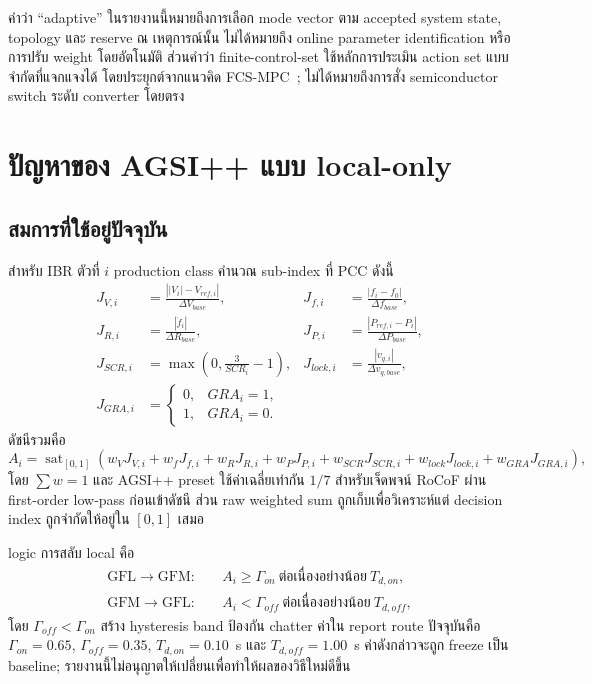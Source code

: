 \documentclass[12pt,a4paper]{article}
\newcommand{\sat}{\operatorname{sat}_{[0,1]}}
\begin{document}
คำว่า ``adaptive'' ในรายงานนี้หมายถึงการเลือก mode vector ตาม accepted system state,
topology และ reserve ณ เหตุการณ์นั้น ไม่ได้หมายถึง online parameter identification หรือการปรับ weight
โดยอัตโนมัติ ส่วนคำว่า finite-control-set ใช้หลักการประเมิน action set แบบจำกัดที่แจกแจงได้
โดยประยุกต์จากแนวคิด FCS-MPC~\cite{rodriguez2013}; ไม่ได้หมายถึงการสั่ง semiconductor switch
ระดับ converter โดยตรง

\section{ปัญหาของ AGSI++ แบบ local-only}

\subsection{สมการที่ใช้อยู่ปัจจุบัน}

สำหรับ IBR ตัวที่ $i$ production class คำนวณ sub-index ที่ PCC ดังนี้
\begin{align}
J_{V,i} &= \frac{\left||V_i|-V_{ref,i}\right|}{\Delta V_{base}}, &
J_{f,i} &= \frac{|f_i-f_0|}{\Delta f_{base}},\\
J_{R,i} &= \frac{|\dot f_i|}{\Delta R_{base}}, &
J_{P,i} &= \frac{|P_{ref,i}-P_i|}{\Delta P_{base}},\\
J_{SCR,i} &= \max\!\left(0,\frac{3}{SCR_i}-1\right), &
J_{lock,i} &= \frac{|v_{q,i}|}{\Delta v_{q,base}},\\
J_{GRA,i} &= \begin{cases}0,&GRA_i=1,\\1,&GRA_i=0.\end{cases}
\end{align}
ดัชนีรวมคือ
\begin{equation}
A_i=\sat\!\left(
w_VJ_{V,i}+w_fJ_{f,i}+w_RJ_{R,i}+w_PJ_{P,i}
+w_{SCR}J_{SCR,i}+w_{lock}J_{lock,i}+w_{GRA}J_{GRA,i}
\right),
\label{eq:agsi}
\end{equation}
โดย $\sum w=1$ และ AGSI++ preset ใช้ค่าเฉลี่ยเท่ากัน $1/7$ สำหรับเจ็ดพจน์
RoCoF ผ่าน first-order low-pass ก่อนเข้าดัชนี ส่วน raw weighted sum ถูกเก็บเพื่อวิเคราะห์แต่
decision index ถูกจำกัดให้อยู่ใน $[0,1]$ เสมอ

logic การสลับ local คือ
\begin{align}
\mathrm{GFL}\rightarrow\mathrm{GFM}:&\quad A_i\ge\Gamma_{on}
\ \text{ต่อเนื่องอย่างน้อย}\ T_{d,on},\\
\mathrm{GFM}\rightarrow\mathrm{GFL}:&\quad A_i<\Gamma_{off}
\ \text{ต่อเนื่องอย่างน้อย}\ T_{d,off},
\end{align}
โดย $\Gamma_{off}<\Gamma_{on}$ สร้าง hysteresis band ป้องกัน chatter ค่าใน report route ปัจจุบันคือ
$\Gamma_{on}=0.65$, $\Gamma_{off}=0.35$, $T_{d,on}=0.10$~s และ $T_{d,off}=1.00$~s
ค่าดังกล่าวจะถูก freeze เป็น baseline; รายงานนี้ไม่อนุญาตให้เปลี่ยนเพื่อทำให้ผลของวิธีใหม่ดีขึ้น
\end{document}
